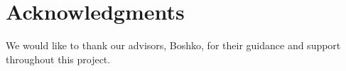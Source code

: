 \documentclass[fleqn,moreauthors,10pt]{ds_report}
\begin{document}

\section*{Acknowledgments}
We would like to thank our advisors, Boshko, for their guidance and support throughout this project.




\end{document}
